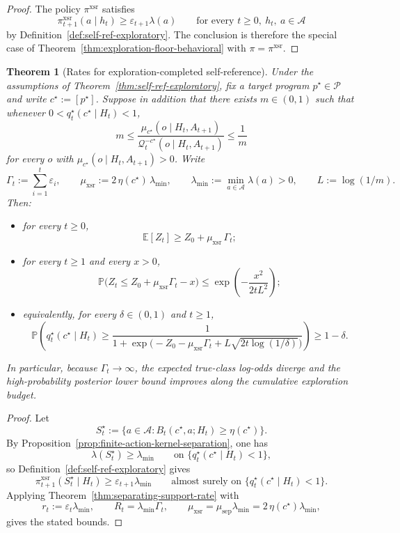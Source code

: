 \documentclass[11pt]{article}
\newtheorem{theorem}{Theorem}[section]
\theoremstyle{definition}
\theoremstyle{remark}
\newcommand{\Acal}{\mathcal{A}}
\newcommand{\Pcal}{\mathcal{P}}
\newcommand{\Qcal}{\mathcal{Q}}
\newcommand{\E}{\mathbb{E}}
\newcommand{\Prob}{\mathbb{P}}
\begin{document}
\begin{proof}
The policy $\pi^{\mathrm{xsr}}$ satisfies
\[
\pi_{t+1}^{\mathrm{xsr}}(a\mid h_t)\ge \varepsilon_{t+1}\lambda(a)
\qquad
\text{for every }t\ge 0,\ h_t,\ a\in\Acal
\]
by Definition~\ref{def:self-ref-exploratory}. The conclusion is therefore the special case of Theorem~\ref{thm:exploration-floor-behavioral} with $\pi=\pi^{\mathrm{xsr}}$.
\end{proof}

\begin{theorem}[Rates for exploration-completed self-reference]
\label{thm:self-ref-exploratory-rate}
Under the assumptions of Theorem~\ref{thm:self-ref-exploratory}, fix a target program $p^\star\in\Pcal$ and write $c^\star:=[p^\star]$. Suppose in addition that there exists $m\in(0,1)$ such that whenever $0<q_t^\star(c^\star\mid H_t)<1$,
\[
m\le
\frac{\mu_{c^\star}(o\mid H_t,A_{t+1})}{\Qcal_t^{-c^\star}(o\mid H_t,A_{t+1})}
\le \frac{1}{m}
\]
for every $o$ with $\mu_{c^\star}(o\mid H_t,A_{t+1})>0$. Write
\[
\Gamma_t:=\sum_{i=1}^t \varepsilon_i,
\qquad
\mu_{\mathrm{xsr}}:=2\,\eta(c^\star)\,\lambda_{\min},
\qquad
\lambda_{\min}:=\min_{a\in\Acal}\lambda(a)>0,
\qquad
L:=\log(1/m).
\]
Then:
\begin{itemize}
\item[(i)] for every $t\ge 0$,
\[
\E[Z_t]\ge Z_0+\mu_{\mathrm{xsr}}\,\Gamma_t;
\]
\item[(ii)] for every $t\ge 1$ and every $x>0$,
\[
\Prob\!\bigl(Z_t\le Z_0+\mu_{\mathrm{xsr}}\Gamma_t-x\bigr)
\le
\exp\!\left(-\frac{x^2}{2tL^2}\right);
\]
\item[(iii)] equivalently, for every $\delta\in(0,1)$ and $t\ge 1$,
\[
\Prob\!\left(
q_t^\star(c^\star\mid H_t)\ge
\frac{1}{1+\exp\!\bigl(-Z_0-\mu_{\mathrm{xsr}}\Gamma_t+L\sqrt{2t\log(1/\delta)}\bigr)}
\right)\ge 1-\delta.
\]
\end{itemize}
In particular, because $\Gamma_t\to\infty$, the expected true-class log-odds diverge and the high-probability posterior lower bound improves along the cumulative exploration budget.
\end{theorem}

\begin{proof}
Let
\[
S_t^\star:=\{a\in\Acal:B_t(c^\star,a;H_t)\ge \eta(c^\star)\}.
\]
By Proposition~\ref{prop:finite-action-kernel-separation}, one has
\[
\lambda(S_t^\star)\ge \lambda_{\min}
\qquad\text{on }\{q_t^\star(c^\star\mid H_t)<1\},
\]
so Definition~\ref{def:self-ref-exploratory} gives
\[
\pi_{t+1}^{\mathrm{xsr}}(S_t^\star\mid H_t)\ge \varepsilon_{t+1}\lambda_{\min}
\qquad\text{almost surely on }\{q_t^\star(c^\star\mid H_t)<1\}.
\]
Applying Theorem~\ref{thm:separating-support-rate} with
\[
r_t:=\varepsilon_t\lambda_{\min},
\qquad
R_t=\lambda_{\min}\Gamma_t,
\qquad
\mu_{\mathrm{xsr}}=\mu_{\mathrm{sep}}\lambda_{\min}
=2\,\eta(c^\star)\lambda_{\min},
\]
gives the stated bounds.
\end{proof}
\end{document}
